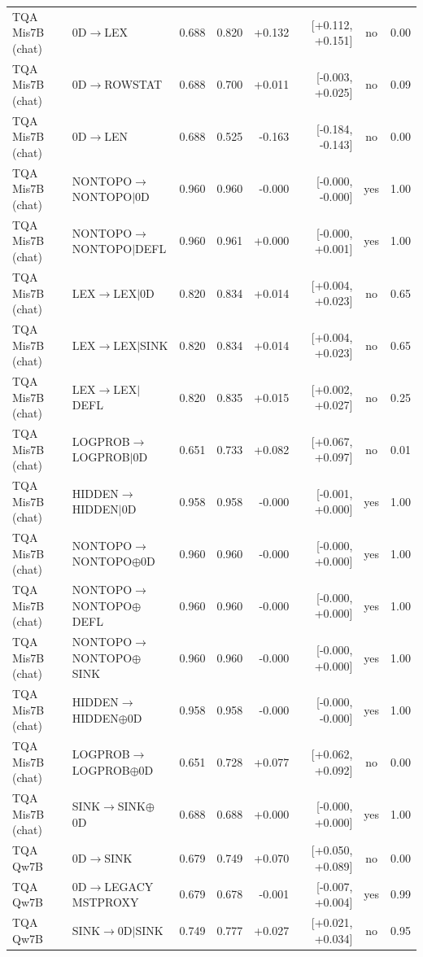 \begin{longtable}{llrrrrcc}
TQA Mis7B (chat) & 0D$\to$LEX & 0.688 & 0.820 & +0.132 & [+0.112, +0.151] & no & 0.00 \\
TQA Mis7B (chat) & 0D$\to$ROWSTAT & 0.688 & 0.700 & +0.011 & [-0.003, +0.025] & no & 0.09 \\
TQA Mis7B (chat) & 0D$\to$LEN & 0.688 & 0.525 & -0.163 & [-0.184, -0.143] & no & 0.00 \\
TQA Mis7B (chat) & NONTOPO$\to$NONTOPO$\mid$0D & 0.960 & 0.960 & -0.000 & [-0.000, -0.000] & yes & 1.00 \\
TQA Mis7B (chat) & NONTOPO$\to$NONTOPO$\mid$DEFL & 0.960 & 0.961 & +0.000 & [-0.000, +0.001] & yes & 1.00 \\
TQA Mis7B (chat) & LEX$\to$LEX$\mid$0D & 0.820 & 0.834 & +0.014 & [+0.004, +0.023] & no & 0.65 \\
TQA Mis7B (chat) & LEX$\to$LEX$\mid$SINK & 0.820 & 0.834 & +0.014 & [+0.004, +0.023] & no & 0.65 \\
TQA Mis7B (chat) & LEX$\to$LEX$\mid$DEFL & 0.820 & 0.835 & +0.015 & [+0.002, +0.027] & no & 0.25 \\
TQA Mis7B (chat) & LOGPROB$\to$LOGPROB$\mid$0D & 0.651 & 0.733 & +0.082 & [+0.067, +0.097] & no & 0.01 \\
TQA Mis7B (chat) & HIDDEN$\to$HIDDEN$\mid$0D & 0.958 & 0.958 & -0.000 & [-0.001, +0.000] & yes & 1.00 \\
TQA Mis7B (chat) & NONTOPO$\to$NONTOPO$\oplus$0D & 0.960 & 0.960 & -0.000 & [-0.000, +0.000] & yes & 1.00 \\
TQA Mis7B (chat) & NONTOPO$\to$NONTOPO$\oplus$DEFL & 0.960 & 0.960 & -0.000 & [-0.000, +0.000] & yes & 1.00 \\
TQA Mis7B (chat) & NONTOPO$\to$NONTOPO$\oplus$SINK & 0.960 & 0.960 & -0.000 & [-0.000, +0.000] & yes & 1.00 \\
TQA Mis7B (chat) & HIDDEN$\to$HIDDEN$\oplus$0D & 0.958 & 0.958 & -0.000 & [-0.000, -0.000] & yes & 1.00 \\
TQA Mis7B (chat) & LOGPROB$\to$LOGPROB$\oplus$0D & 0.651 & 0.728 & +0.077 & [+0.062, +0.092] & no & 0.00 \\
TQA Mis7B (chat) & SINK$\to$SINK$\oplus$0D & 0.688 & 0.688 & +0.000 & [-0.000, +0.000] & yes & 1.00 \\
TQA Qw7B & 0D$\to$SINK & 0.679 & 0.749 & +0.070 & [+0.050, +0.089] & no & 0.00 \\
TQA Qw7B & 0D$\to$LEGACY MSTPROXY & 0.679 & 0.678 & -0.001 & [-0.007, +0.004] & yes & 0.99 \\
TQA Qw7B & SINK$\to$0D$\mid$SINK & 0.749 & 0.777 & +0.027 & [+0.021, +0.034] & no & 0.95 \\

\end{longtable}
